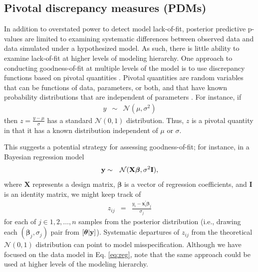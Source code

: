 \documentclass[12pt,english]{article}
\begin{document}
\begin{spacing}{1.9}
\subsection{Pivotal discrepancy measures (PDMs)}

In addition to overstated power to detect model lack-of-fit, posterior
predictive p-values are limited to examining systematic differences
between observed data and data simulated under a hypothesized model.
As such, there is little ability to examine lack-of-fit at higher
levels of modeling hierarchy.  One approach to conducting
goodness-of-fit at multiple levels of the model is to use discrepancy
functions based on pivotal quantities
\citep{Johnson2004,YuanJohnson2012}.  Pivotal quantities are random
variables that can be functions of data, parameters, or both, and that
have known probability distributions that are independent of
parameters \citep[see e.g.,][section 9.2.2]{CasellaBerger1990}.  For
instance, if
\begin{eqnarray*}
  y & \sim & \mathcal{N}(\mu,\sigma^2)
\end{eqnarray*}
then $z = \frac{y-\mu}{\sigma}$ has a standard $\mathcal{N}(0,1)$
distribution. Thus, $z$ is a pivotal quantity in that it has a known
distribution independent of $\mu$ or $\sigma$.

This suggests a potential strategy for assessing goodness-of-fit; for
instance, in a Bayesian regression model
\begin{eqnarray}
  \label{eq:reg}
  {\bf y} & \sim & \mathcal{N}(\textbf{X} \boldsymbol{\beta},\sigma^2 \textbf{I}),
\end{eqnarray}
where $\textbf{X}$ represents a design matrix, $\boldsymbol{\beta}$ is
a vector of regression coefficients, and $\textbf{I}$ is an identity
matrix, we might keep track of
\begin{eqnarray}
  \label{eq:resid}
  z_{ij} & = & \frac{y_i - \textbf{x}_i^\prime \boldsymbol{\beta}_j}{\sigma_j}
\end{eqnarray}
for each of $j \in {1, 2, \hdots, n}$ samples from the posterior
distribution (i.e., drawing each $(\boldsymbol{\beta}_j, \sigma_j)$
pair from $[\boldsymbol{\theta}|{\bf y}]$).  Systematic departures of
$z_{ij}$ from the theoretical $\mathcal{N}(0,1)$ distribution can
point to model misspecification.  Although we have focused on the data
model in Eq. \ref{eq:reg}, note that the same approach could be used
at higher levels of the modeling hierarchy.


\end{spacing}
\end{document}

